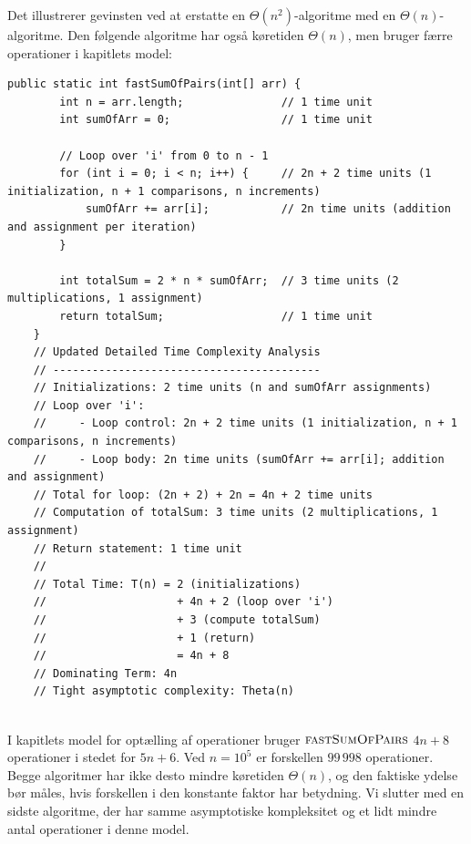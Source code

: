 Det illustrerer gevinsten ved at erstatte en $\Theta(n^2)$-algoritme med en $\Theta(n)$-algoritme. Den følgende algoritme har også køretiden $\Theta(n)$, men bruger færre operationer i kapitlets model:


\begin{lstlisting}[style = javaStyle, caption={Hurtig sum af par med analyse}, label={lst:java_fast_sum_pairs_analysis}]
    public static int fastSumOfPairs(int[] arr) {
        int n = arr.length;               // 1 time unit
        int sumOfArr = 0;                 // 1 time unit
    
        // Loop over 'i' from 0 to n - 1
        for (int i = 0; i < n; i++) {     // 2n + 2 time units (1 initialization, n + 1 comparisons, n increments)
            sumOfArr += arr[i];           // 2n time units (addition and assignment per iteration)
        }
    
        int totalSum = 2 * n * sumOfArr;  // 3 time units (2 multiplications, 1 assignment)
        return totalSum;                  // 1 time unit
    }
    // Updated Detailed Time Complexity Analysis
    // -----------------------------------------
    // Initializations: 2 time units (n and sumOfArr assignments)
    // Loop over 'i':
    //     - Loop control: 2n + 2 time units (1 initialization, n + 1 comparisons, n increments)
    //     - Loop body: 2n time units (sumOfArr += arr[i]; addition and assignment)
    // Total for loop: (2n + 2) + 2n = 4n + 2 time units
    // Computation of totalSum: 3 time units (2 multiplications, 1 assignment)
    // Return statement: 1 time unit
    //
    // Total Time: T(n) = 2 (initializations)
    //                    + 4n + 2 (loop over 'i')
    //                    + 3 (compute totalSum)
    //                    + 1 (return)
    //                    = 4n + 8
    // Dominating Term: 4n
    // Tight asymptotic complexity: Theta(n)
    
\end{lstlisting}  

I kapitlets model for optælling af operationer bruger $\proc{fastSumOfPairs}$ $4n+8$ operationer i stedet for $5n+6$. Ved $n=10^5$ er forskellen $99\,998$ operationer. Begge algoritmer har ikke desto mindre køretiden $\Theta(n)$, og den faktiske ydelse bør måles, hvis forskellen i den konstante faktor har betydning. Vi slutter med en sidste algoritme, der har samme asymptotiske kompleksitet og et lidt mindre antal operationer i denne model.

